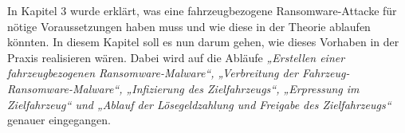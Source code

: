 In Kapitel 3 wurde erklärt, was eine fahrzeugbezogene Ransomware-Attacke 
für nötige Voraussetzungen haben muss und wie diese in der Theorie ablaufen 
könnten. 
In diesem Kapitel soll es nun darum gehen, wie dieses Vorhaben in der Praxis 
realisieren wären. 
\newline
Dabei wird auf die Abläufe \textit{„Erstellen einer 
fahrzeugbezogenen Ransomware-Malware“, „Verbreitung der Fahrzeug-Ransomware-Malware“, 
„Infizierung des Zielfahrzeugs“, „Erpressung im Zielfahrzeug“ und „Ablauf der 
Lösegeldzahlung und Freigabe des Zielfahrzeugs“} genauer eingegangen.
